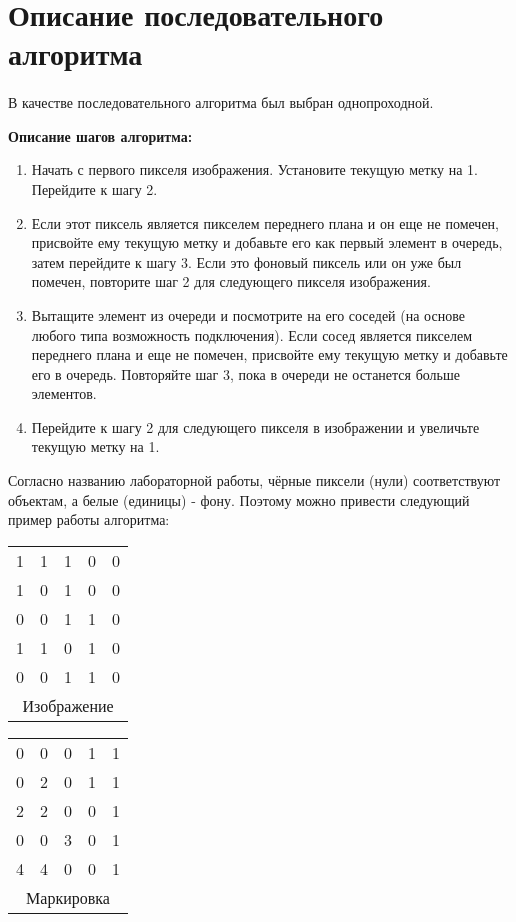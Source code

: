 \documentclass[14pt]{extarticle}
\begin{document}
\section{Описание последовательного алгоритма}
\paragraph{}В качестве последовательного алгоритма был выбран однопроходной.
\par \textbf{Описание шагов алгоритма:}
\begin{enumerate}
    \item Начать с первого пикселя изображения. Установите текущую метку на 1. Перейдите к шагу 2.
    \item Если этот пиксель является пикселем переднего плана и он еще не помечен, присвойте ему текущую метку и добавьте его как первый элемент в очередь, затем перейдите к шагу 3. Если это фоновый пиксель или он уже был помечен, повторите шаг 2 для следующего пикселя изображения.
    \item Вытащите элемент из очереди и посмотрите на его соседей (на основе любого типа возможность подключения). Если сосед является пикселем переднего плана и еще не помечен, присвойте ему текущую метку и добавьте его в очередь. Повторяйте шаг 3, пока в очереди не останется больше элементов.
    \item Перейдите к шагу 2 для следующего пикселя в изображении и увеличьте текущую метку на 1.
\end{enumerate}
\par Согласно названию лабораторной работы, чёрные пиксели (нули) соответствуют объектам, а белые (единицы) - фону. Поэтому можно привести следующий пример работы алгоритма:
\par
\hfill
\begin{tabular}{ |c c c c c| }
\hline
 1 & 1 & 1 & 0 & 0\\
 1 & 0 & 1 & 0 & 0\\
 0 & 0 & 1 & 1 & 0\\
 1 & 1 & 0 & 1 & 0\\
 0 & 0 & 1 & 1 & 0\\
 \hline
 \multicolumn{5}{c}{Изображение}
\end{tabular}
\qquad
\begin{tabular}{ |c c c c c| }
\hline
 0 & 0 & 0 & 1 & 1\\
 0 & 2 & 0 & 1 & 1\\
 2 & 2 & 0 & 0 & 1\\
 0 & 0 & 3 & 0 & 1\\
 4 & 4 & 0 & 0 & 1\\
 \hline
 \multicolumn{5}{c}{Маркировка}
\end{tabular}
\hfill \break
\newpage
\end{document}
